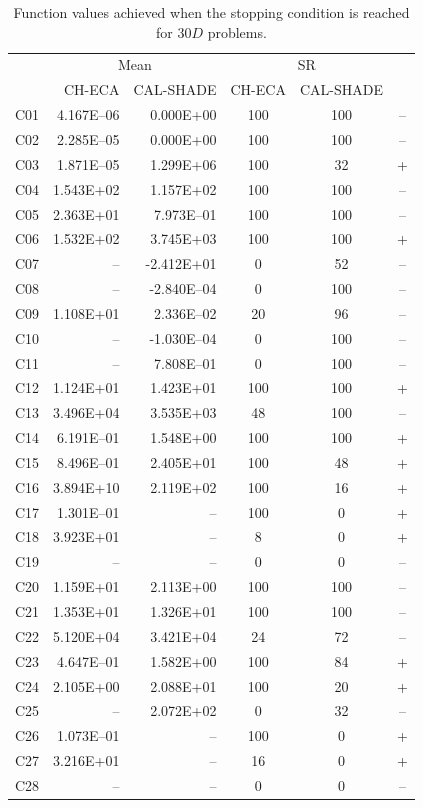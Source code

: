 \documentclass[conference]{IEEEtran}
\begin{document}
% 
% 
% 
\begin{table}[!ht]
	\caption{Function values achieved when the stopping condition is reached for $30D$ problems.}
	\centering
	\begin{tabular}{|c|r|r|c|c|c|}
	 \hline
	 &\multicolumn{2}{|c|}{Mean} & \multicolumn{2}{|c|}{SR} & \\
	\cline{2-5}
	 & CH-ECA & CAL-SHADE & CH-ECA & CAL-SHADE & \\ \hline

C01 & 4.167E--06 & 0.000E+00 &  100 &  100 & -- \\ 
C02 & 2.285E--05 & 0.000E+00 &  100 &  100 & -- \\ 
C03 & 1.871E--05 & 1.299E+06 &  100 &   32 & + \\ 
C04 & 1.543E+02 & 1.157E+02 &  100 &  100 & -- \\ 
C05 & 2.363E+01 & 7.973E--01 &  100 &  100 & -- \\ 
C06 & 1.532E+02 & 3.745E+03 &  100 &  100 & + \\ 
C07 &  -- & -2.412E+01 &    0 &   52 & -- \\ 
C08 &  -- & -2.840E--04 &    0 &  100 & -- \\ 
C09 & 1.108E+01 & 2.336E--02 &   20 &   96 & -- \\ 
C10 &  -- & -1.030E--04 &    0 &  100 & -- \\ 
C11 &  -- & 7.808E--01 &    0 &  100 & -- \\ 
C12 & 1.124E+01 & 1.423E+01 &  100 &  100 & + \\ 
C13 & 3.496E+04 & 3.535E+03 &   48 &  100 & -- \\ 
C14 & 6.191E--01 & 1.548E+00 &  100 &  100 & + \\ 
C15 & 8.496E--01 & 2.405E+01 &  100 &   48 & + \\ 
C16 & 3.894E+10 & 2.119E+02 &  100 &   16 & + \\ 
C17 & 1.301E--01 &  -- &  100 &    0 & + \\ 
C18 & 3.923E+01 &  -- &    8 &    0 & + \\ 
C19 &  -- &  -- &    0 &    0 & -- \\ 
C20 & 1.159E+01 & 2.113E+00 &  100 &  100 & -- \\ 
C21 & 1.353E+01 & 1.326E+01 &  100 &  100 & -- \\ 
C22 & 5.120E+04 & 3.421E+04 &   24 &   72 & -- \\ 
C23 & 4.647E--01 & 1.582E+00 &  100 &   84 & + \\ 
C24 & 2.105E+00 & 2.088E+01 &  100 &   20 & + \\ 
C25 &  -- & 2.072E+02 &    0 &   32 & -- \\ 
C26 & 1.073E--01 &  -- &  100 &    0 & + \\ 
C27 & 3.216E+01 &  -- &   16 &    0 & + \\ 
C28 &  -- &  -- &    0 &    0 & -- \\ 
   \hline
	\end{tabular}
	\label{tab:d30c}
\end{table}
\end{document}
